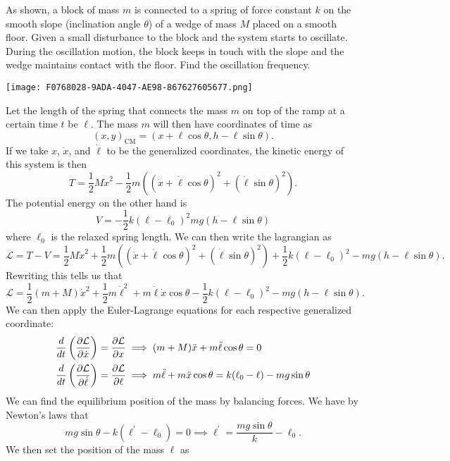 \documentclass[11pt]{scrartcl}
\begin{document}
\begin{example}
As shown, a block of mass $m$ is connected to a spring of force constant $k$ on the smooth slope (inclination angle $\theta$) of a wedge of mass $M$ placed on a smooth floor. Given a small disturbance to the block and the system starts to oscillate. During the oscillation motion, the block keeps in touch with the slope and the wedge maintains contact with the floor. Find the oscillation frequency. 
\begin{center}
    \texttt{[image: F0768028-9ADA-4047-AE98-867627605677.png]}
\end{center}
\end{example}
\begin{soln}
Let the length of the spring that connects the mass $m$ on top of the ramp at a certain time $t$ be $\ell$. The mass $m$ will then have coordinates of time as 
\[(x, y)_{\text{CM}} = (x + \ell \cos \theta, h - \ell \sin\theta).\]
If we take $x$, $\dot{x}$, and $\dot\ell$ to be the generalized coordinates, the kinetic energy of this system is then 
\[T = \frac{1}{2}M\dot{x}^2 - \frac{1}{2}m \left((\dot{x} + \dot\ell\cos \theta)^2 + (\dot\ell\sin\theta)^2\right).\]
The potential energy on the other hand is 
\[V = -\frac{1}{2}k (\ell - \ell_0)^2 mg (h - \ell \sin \theta)\]
where $\ell_0$ is the relaxed spring length. We can then write the lagrangian as 
\[\mathcal{L} = T - V = \frac{1}{2}M\dot{x}^2 + \frac{1}{2}m \left((\dot{x} + \dot\ell\cos \theta)^2 + (\dot\ell\sin\theta)^2\right) + \frac{1}{2}k (\ell - \ell_0)^2 - mg (h - \ell \sin \theta).\]
Rewriting this tells us that 
\[\mathcal{L} = \frac{1}{2}(m + M)\dot{x}^2 + \frac{1}{2}m\dot\ell^2 + m\dot\ell\dot{x}\cos\theta - \frac{1}{2}k (\ell  - \ell_0)^2 - mg(h - \ell \sin\theta).\]
We can then apply the Euler-Lagrange equations for each respective generalized coordinate:
\begin{align*}
    \frac{d}{dt}\left(\pdv{\mathcal{L}}{\dot{x}}\right) &= \pdv{\mathcal{L}}{x}\implies (m + M)\ddot{x} + m\ddot\ell \cos \theta = 0 \\
    \frac{d}{dt}\left(\pdv{\mathcal{L}}{\dot{\ell}}\right) &= \pdv{\mathcal{L}}{\ell} \implies m\ddot\ell + m\ddot{x}\cos\theta = k(\ell_0 - \ell) - mg\sin\theta
\end{align*}
We can find the equilibrium position of the mass by balancing forces. We have by Newton's laws that 
\[mg\sin\theta - k(\ell^{\prime} - \ell_0) = 0\implies \ell^{\prime} = \frac{mg\sin\theta}{k} - \ell_0.\]
We then set the position of the mass $\ell$ as 

\end{soln}
\end{document}
